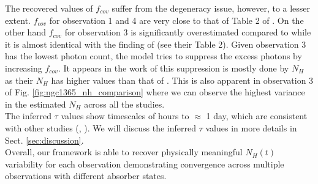 \documentclass{aa}
\begin{document}
The recovered values of $f_{cov}$ suffer from the degeneracy issue, however, to a lesser extent. $f_{cov}$ for observation 1 and 4 are very close to that of Table 2 of \citet{Braito2014}. On the other hand $f_{cov}$ for observation 3 is significantly overestimated compared to \citet{Braito2014} while it is almost identical with the finding of \citet{Mondal2022} (see their Table 2). Given observation 3 has the lowest photon count, the model tries to suppress the excess photons by increasing $f_{cov}$. It appears in the work of \citet{Braito2014} this suppression is mostly done by $N_H$ as their $N_H$ has higher values than that of \citet{Mondal2022}. This is also apparent in observation 3 of Fig. \ref{fig:ngc1365_nh_comparison} where we can observe the highest variance in the estimated $N_H$ across all the studies. \\
The inferred $\tau$ values show timescales of hours to $\approx$ 1 day, which are consistent with other studies (\citealt{Risaliti2007}, \citealt{Braito2014}). We will discuss the inferred $\tau$ values in more details in Sect. \ref{sec:discussion}. \\
Overall, our framework is able to recover physically meaningful $N_H(t)$ variability for each observation demonstrating convergence across multiple observations with different absorber states. \\
\end{document}
